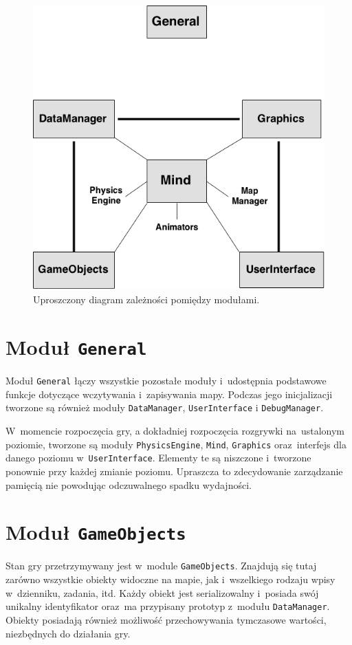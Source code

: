 \documentclass[licencjacka]{pracamgr}
\begin{document}
    \begin{figure}[htbp]
      \centering
      \includegraphics[scale=0.5]{diagram-klas.png}
      \caption{Uproszczony diagram zależności pomiędzy modułami.}
    \end{figure}

  \section{Moduł \texttt{General}}
    Moduł \texttt{General} łączy wszystkie pozostałe moduły i~udostępnia podstawowe funkcje dotyczące wczytywania i~zapisywania
    mapy. Podczas jego inicjalizacji tworzone są również moduły \texttt{DataManager}, \texttt{UserInterface} i
    \texttt{DebugManager}.

    W~momencie rozpoczęcia gry, a dokładniej rozpoczęcia rozgrywki na~ustalonym poziomie, tworzone są moduły \texttt{PhysicsEngine},
    \texttt{Mind}, \texttt{Graphics} oraz~interfejs dla danego poziomu w~\texttt{UserInterface}. Elementy te są niszczone i~tworzone
    ponownie przy każdej zmianie poziomu. Upraszcza to zdecydowanie zarządzanie pamięcią nie powodując odczuwalnego spadku wydajności.

  \section{Moduł \texttt{GameObjects}}
    Stan gry przetrzymywany jest w~module \texttt{GameObjects}. Znajdują się tutaj zarówno wszystkie obiekty widoczne na
    mapie, jak i~wszelkiego rodzaju wpisy w~dzienniku, zadania, itd. Każdy obiekt jest serializowalny i~posiada swój unikalny
    identyfikator oraz~ma przypisany prototyp z~modułu \texttt{DataManager}. Obiekty posiadają również możliwość przechowywania
    tymczasowe wartości, niezbędnych do działania gry.
\end{document}
